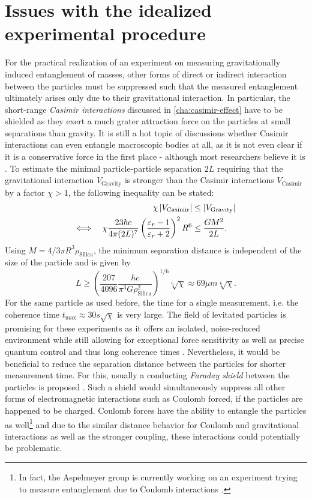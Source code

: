 \section{Issues with the idealized experimental procedure}\label{sec:2:experimental-problems}

For the practical realization of an experiment on measuring gravitationally induced entanglement of masses, other forms of direct or indirect interaction between the particles must be suppressed such that the measured entanglement ultimately arises only due to their gravitational interaction.
In particular, the short-range \emph{Casimir interactions} \cite{Casimir_1948} discussed in \cref{cha:casimir-effect} have to be shielded as they exert a much grater attraction force on the particles at small separations than gravity.
It is still a hot topic of discussions whether Casimir interactions can even entangle macroscopic bodies at all, as it is not even clear if it is a conservative force in the first place - although most researchers believe it is \cite{DeBiase_2012,Yi_2023}.
To estimate the minimal particle-particle separation $2L$ requiring that the gravitational interaction $V_\mathrm{Gravity}$ is stronger than the Casimir interactions $V_\mathrm{Casimir}$ \cite{Emig_2007} by a factor $\chi > 1$, the following inequality can be stated:
\begin{align}
  \chi \left\lvert V_\mathrm{Casimir}\right\rvert &\leq \left\lvert V_\mathrm{Gravity}\right\rvert \\
  \Longleftrightarrow \quad \chi \frac{23 \hbar c}{4 \pi (2L)^7} \left(\frac{\varepsilon_r - 1}{\varepsilon_r + 2}\right)^2 R^6 &\leq  \frac{G M^2}{2L} .
\end{align}
Using $M = 4/3 \pi R^3\rho_\mathrm{Silica}$, the minimum separation distance is independent of the size of the particle and is given by
\begin{equation}
  L \geq \left(\frac{207}{4096} \frac{\hbar c}{\pi^3 G \rho_\mathrm{Silica}^2}\right)^{1/6} \sqrt[6]{\chi} \approx 69\si{\mu m} \sqrt[6]{\chi} .
\end{equation}
For the same particle as used before, the time for a single measurement, i.e. the coherence time $t_\mathrm{max} \approx 30\si{s} \sqrt{\chi}$ is very large.
The field of levitated particles is promising for these experiments as it offers an isolated, noise-reduced environment while still allowing for exceptional force sensitivity as well as precise quantum control and thus long coherence times \cite{Aspelmeyer_2024,GonzalezBallestero_2021}.
Nevertheless, it would be beneficial to reduce the separation distance between the particles for shorter measurement time.
For this, usually a conducting \emph{Faraday shield} between the particles is proposed \cite{Kamp_2020}.
Such a shield would simultaneously suppress all other forms of electromagnetic interactions such as Coulomb forced, if the particles are happened to be charged.
Coulomb forces have the ability to entangle the particles as well\footnote{In fact, the Aspelmeyer group is currently working on an experiment trying to measure entanglement due to Coulomb interactions \cite{Rudolph_2022}.} and due to the similar distance behavior for Coulomb and gravitational interactions as well as the stronger coupling, these interactions could potentially be problematic.

